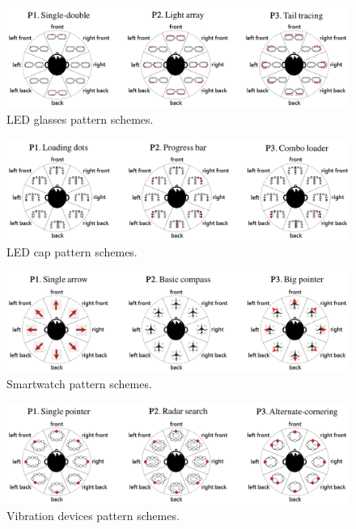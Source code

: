 \documentclass{sigchi}
\begin{document}
\begin{figure}[!t]
\centering
\includegraphics[width=2.0\columnwidth]{glasses_pattern_combine}
\caption{LED glasses pattern schemes.}
\label{fig:glasses_scheme}
\end{figure}

\begin{figure}[!t]
\centering
\includegraphics[width=2.0\columnwidth]{hat_pattern_combine}
\caption{LED cap pattern schemes.}
\label{fig:cap_scheme}
\end{figure}

\begin{figure}[!t]
\centering
\includegraphics[width=2.0\columnwidth]{smartwatch_pattern_combine}
\caption{Smartwatch pattern schemes.}
\label{fig:smartwatch_scheme}
\end{figure}

\begin{figure}[!t]
\centering
\includegraphics[width=2.0\columnwidth]{vibration_pattern_combine}
\caption{Vibration devices pattern schemes.}
\label{fig:vibratin_scheme}
\end{figure}
\end{document}
